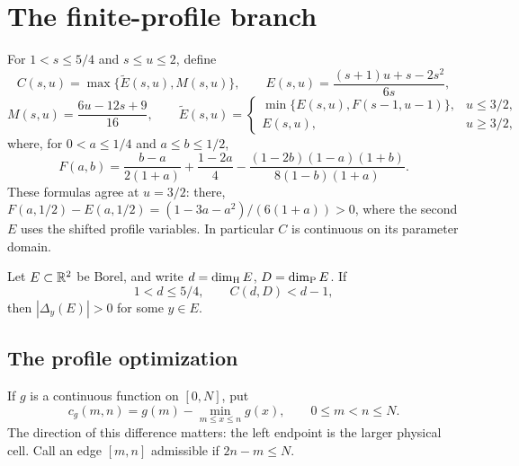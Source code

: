 \clearpage
\section{The finite-profile branch}\label{fprof:section}

For \(1<s\le5/4\) and \(s\le u\le2\), define
\begin{equation}\label{fprof:A}
 C(s,u)=\max\{\widetilde E(s,u),M(s,u)\},\qquad
 E(s,u)=\frac{(s+1)u+s-2s^2}{6s},
\end{equation}
$$
 M(s,u)=\frac{6u-12s+9}{16},\qquad
 \widetilde E(s,u)=\begin{cases}
 \min\{E(s,u),F(s-1,u-1)\},&u\le3/2,\\[3pt]
 E(s,u),&u\ge3/2,
 \end{cases}
$$
where, for \(0<a\le1/4\) and \(a\le b\le1/2\),
$$
 F(a,b)=\frac{b-a}{2(1+a)}+\frac{1-2a}{4}
       -\frac{(1-2b)(1-a)(1+b)}{8(1-b)(1+a)}.
$$
These formulas agree at \(u=3/2\): there,
\(F(a,1/2)-E(a,1/2)=(1-3a-a^2)/(6(1+a))>0\),
where the second \(E\) uses the shifted profile variables. In particular \(C\)
is continuous on its parameter domain.

\begin{theorem}\label{fprof:main}
Let \(E\subset\mathbb R^2\) be Borel, and write \(d=\dim_{\mathrm H} E\), \(D=\dim_{\mathrm P} E\). If
\begin{equation}\label{fprof:condition}
 1<d\le5/4,\qquad C(d,D)<d-1,
\end{equation}
then \(|\Delta_y(E)|>0\) for some \(y\in E\).
\end{theorem}

\subsection{The profile optimization}

If \(g\) is a continuous function on \([0,N]\), put
$$
 c_g(m,n)=g(m)-\min_{m\leq x\leq n}g(x),\qquad 0\leq m<n\leq N.
$$
The direction of this difference matters: the left endpoint is the larger physical cell. Call an edge \([m,n]\) admissible if \(2n-m\leq N\).

